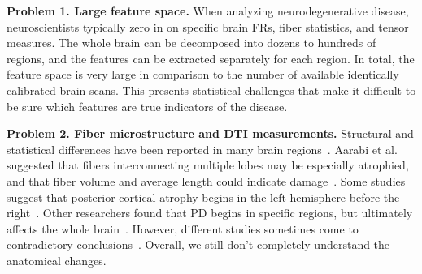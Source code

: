 \noindent\textbf{Problem 1. Large feature space.}
When analyzing neurodegenerative disease, neuroscientists typically zero in on specific brain FRs, fiber statistics, and tensor measures. 
The whole brain
can be decomposed into dozens to hundreds of 
regions, 
and the features can be extracted 
separately
for each region. In total, the feature space is very large in  
comparison to the number of available identically calibrated brain scans.
This presents statistical challenges that make it difficult to be sure which features are true indicators of the disease.

\vspace{1pt}
\noindent\textbf{Problem 2. Fiber microstructure and DTI measurements.}
Structural and statistical differences 
have been reported in many brain regions~\cite{zhang2015diffusion, wei2016combined,aarabi2015statistical}. Aarabi et al. suggested that fibers interconnecting multiple lobes may be 
especially atrophied, and that fiber volume and average 
length could %
indicate damage~\cite{aarabi2015statistical}. Some studies
suggest that posterior cortical atrophy begins in the left hemisphere before the right~\cite{claassen2016cortical}. 
Other researchers found that PD %
begins in specific regions, but ultimately affects the whole brain~\cite{olde2013disrupted, yau2018network}.
However, different studies sometimes come to contradictory conclusions~\cite{zhang2015diffusion, wen2016white}. Overall, we still don't completely understand the anatomical changes.

